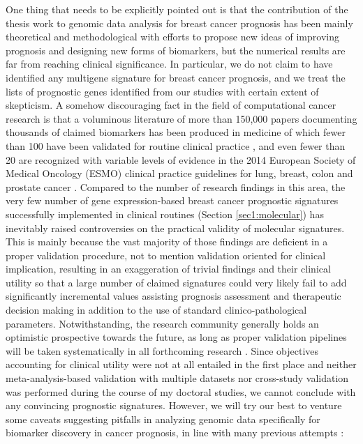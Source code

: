 One thing that needs to be explicitly pointed out is that the contribution of the thesis work to genomic data analysis for breast cancer prognosis has been mainly theoretical and methodological with efforts to propose new ideas of improving prognosis and designing new forms of biomarkers, but the numerical results are far from reaching clinical significance. In particular, we do not claim to have identified any multigene signature for breast cancer prognosis, and we treat the lists of prognostic genes identified from our studies with certain extent of skepticism. A somehow discouraging fact in the field of computational cancer research is that a voluminous literature of more than 150,000 papers documenting thousands of claimed biomarkers has been produced in medicine of which fewer than 100 have been validated for routine clinical practice \cite{Poste2011Bring}, and even fewer than 20 are recognized with variable levels of evidence in the 2014 European Society of Medical Oncology (ESMO) clinical practice guidelines for lung, breast, colon and prostate cancer \cite{Schneider2015Establishing}. Compared to the number of research findings in this area, the very few number of gene expression-based breast cancer prognostic signatures successfully implemented in clinical routines (Section \ref{sec1:molecular}) has inevitably raised controversies on the practical validity of molecular signatures. This is mainly because the vast majority of those findings are deficient in a proper validation procedure, not to mention validation oriented for clinical implication, resulting in an exaggeration of trivial findings and their clinical utility so that a large number of claimed signatures could very likely fail to add significantly incremental values assisting prognosis assessment and therapeutic decision making in addition to the use of standard clinico-pathological parameters. Notwithstanding, the research community generally holds an optimistic prospective towards the future, as long as proper validation pipelines will be taken systematically in all forthcoming research \cite{Michiels2016Statistical}. Since objectives accounting for clinical utility were not at all entailed in the first place and neither meta-analysis-based validation with multiple datasets nor cross-study validation was performed during the course of my doctoral studies, we cannot conclude with any convincing prognostic signatures. However, we will try our best to venture some caveats suggesting pitfalls in analyzing genomic data specifically for biomarker discovery in cancer prognosis, in line with many previous attempts \cite{Ambroise2002Selection, Simon2003Pitfalls, Issaq2011Cancer, Weigelt2012Challenges}:


